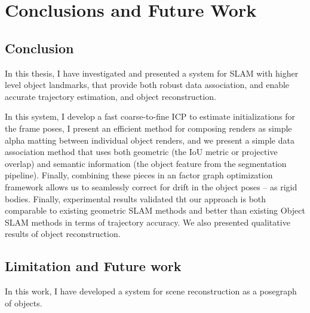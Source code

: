 
\chapter{Conclusions and Future Work} \label{chap:conclusion}

\section{Conclusion}
In this thesis, I have investigated and presented a system for SLAM with higher level object landmarks, that provide both robust data association, and enable accurate trajectory estimation, and object reconstruction.

In this system, I develop a fast coarse-to-fine ICP to estimate initializations for the frame poses, I present an efficient method for composing renders as simple alpha matting between individual object renders, and we present a simple data association method that uses both geometric (the IoU metric or projective overlap) and semantic information (the object feature from the segmentation pipeline). Finally, combining these pieces in an factor graph optimization framework allows us to seamlessly correct for drift in the object poses -- as rigid bodies. Finally, experimental results validated tht our approach is both comparable to existing geometric SLAM methods and better than existing Object SLAM methods in terms of trajectory accuracy. We also presented qualitative results of object reconstruction.

\section{Limitation and Future work}

In this work, I have developed a system for scene reconstruction as a posegraph of objects.

